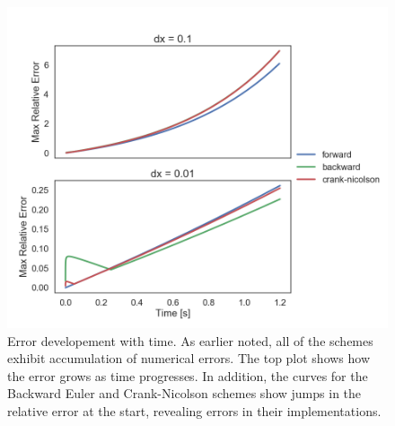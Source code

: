 \documentclass[aps,reprint]{revtex4-1}
\begin{document}
\begin{figure}[ht]
  \centering
  \includegraphics[width=\columnwidth]{figures/relative_error_in_time.png}
  \caption{\label{fig:timerelerr} Error developement with time. As earlier
    noted, all of the schemes exhibit accumulation of numerical errors. The top
    plot shows how the error grows as time progresses. In addition, the curves
    for the Backward Euler and Crank-Nicolson schemes show jumps in the relative
  error at the start, revealing errors in their implementations.}
\end{figure}
\end{document}
